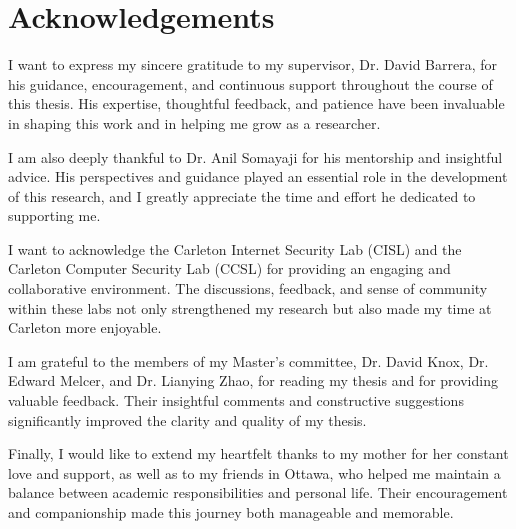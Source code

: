 \chapter*{Acknowledgements}
\fontsize{12pt}{14pt} \selectfont
\begin{doublespace}
I want to express my sincere gratitude to my supervisor, Dr. David Barrera, for his guidance, encouragement, and continuous support throughout the course of this thesis. His expertise, thoughtful feedback, and patience have been invaluable in shaping this work and in helping me grow as a researcher.

I am also deeply thankful to Dr. Anil Somayaji for his mentorship and insightful advice. His perspectives and guidance played an essential role in the development of this research, and I greatly appreciate the time and effort he dedicated to supporting me.

I want to acknowledge the Carleton Internet Security Lab (CISL) and the Carleton Computer Security Lab (CCSL) for providing an engaging and collaborative environment. The discussions, feedback, and sense of community within these labs not only strengthened my research but also made my time at Carleton more enjoyable.

I am grateful to the members of my Master’s committee, Dr. David Knox, Dr. Edward Melcer, and Dr. Lianying Zhao, for reading my thesis and for providing valuable feedback. Their insightful comments and constructive suggestions significantly improved the clarity and quality of my thesis.

Finally, I would like to extend my heartfelt thanks to my mother for her constant love and support, as well as to my friends in Ottawa, who helped me maintain a balance between academic responsibilities and personal life. Their encouragement and companionship made this journey both manageable and memorable.
\end{doublespace}